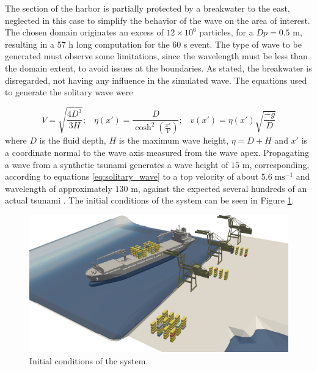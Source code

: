 The section of the harbor is partially protected by a breakwater to the east, neglected in this case to simplify the behavior of the wave on the area of interest. The chosen domain originates an excess of $12\times10^6$ particles, for a $Dp=0.5$ m, resulting in a 57 h long computation for the 60 s event. The type of wave to be generated must observe some limitations, since the wavelength must be less than the domain extent, to avoid issues at the boundaries. As stated, the breakwater is disregarded, not having any influence in the simulated wave. The equations used to generate the solitary wave were \citep{Dean-Dalrymple-1991}

%
\begin{equation} \label{eq:solitary_wave}
	V=\sqrt{\frac{4D^3}{3H}}; \;\;\; \eta(x')=\frac{D}{\cosh^2\left(\frac{x'}{V}\right)} ; \;\;\; v(x')=\eta(x')\sqrt{\frac{-g}{D}}
\end{equation}
%
where $D$ is the fluid depth, $H$ is the maximum wave height, $\eta=D+H$ and $x'$ is a coordinate normal to the wave axis measured from the wave apex. Propagating a wave from a synthetic tsunami generates a wave height of $15$ m, corresponding, according to equations \eqref{eq:solitary_wave} to a top velocity of about $5.6\;\text{ms}^{-1}$ and wavelength of approximately $130$ m, against the expected several hundreds of an actual tsunami \cite{mavbaptista-2011}. The initial conditions of the system can be seen in Figure \ref{fig:sines_ini_cond}.

%
\begin{figure}[ht!]
	\centering
	\includegraphics[width=0.95\linewidth]{Figures/6.Chapter/sines_ini_cond_II} 
	\caption{Initial conditions of the system.}
	\label{fig:sines_ini_cond} 
\end{figure}
%

